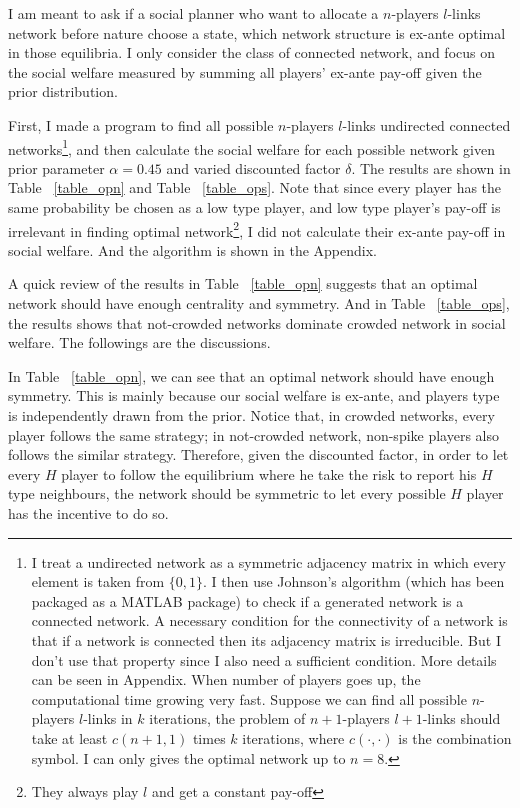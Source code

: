 \documentclass[12pt,letter]{article}
\theoremstyle{remark}
\theoremstyle{remark}
\theoremstyle{claim}
\begin{document}
I am meant to ask if a social planner who want to allocate a $n$-players $l$-links network before nature choose a state, which network structure is ex-ante optimal in those equilibria. I only consider the class of connected network, and focus on the social welfare measured by summing all players' ex-ante pay-off given the prior distribution. 

First, I made a program to find all possible $n$-players $l$-links undirected connected networks\footnote{I treat a undirected network as a symmetric adjacency matrix in which every element is taken from $\{0,1\}$. I then use Johnson's algorithm \cite{Johnson1977} (which has been packaged as a MATLAB package) to check if a generated network is a connected network. A necessary condition for  the connectivity of a network is that if a network is connected then its adjacency matrix is irreducible. But I don't use that property since I also need a sufficient condition. More details can be seen in Appendix. When number of players goes up, the computational time growing very fast. Suppose we can find all possible $n$-players $l$-links in $k$ iterations, the problem of $n+1$-players $l+1$-links  should take at least $c(n+1,1)$ times $k$ iterations, where $c(\cdot,\cdot)$ is the combination symbol. I can only gives the optimal network up to $n=8$.}, and then calculate the social welfare for each possible network given prior parameter $\alpha=0.45$ and varied discounted factor $\delta$. The results are shown in Table ~\ref{table_opn} and Table ~\ref{table_ops}. Note that since every player has the same probability be chosen as a low type player, and low type player's pay-off is irrelevant in finding optimal network\footnote{They always play $l$ and get a constant pay-off}, I did not calculate their ex-ante pay-off in social welfare. And the algorithm is shown in the Appendix.

A quick review of the results in Table ~\ref{table_opn} suggests that an optimal network should have enough centrality and symmetry.  And in Table ~\ref{table_ops}, the results shows that not-crowded networks dominate crowded network in social welfare. The followings are the discussions.

In Table ~\ref{table_opn}, we can see that an optimal network should have enough symmetry. This is mainly because our social welfare is ex-ante, and players type is independently drawn from the prior. Notice that, in crowded networks, every player follows the same strategy; in not-crowded network, non-spike players also follows the similar strategy. Therefore, given the discounted factor, in order to let every $H$ player to follow the equilibrium where he take the risk to report his $H$ type neighbours, the network should be symmetric to let every possible $H$ player has the incentive to do so.
\end{document}

